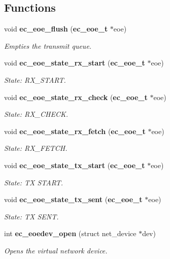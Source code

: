 \subsection*{Functions}
\begin{DoxyCompactItemize}
\item 
void {\bf ec\-\_\-eoe\-\_\-flush} ({\bf ec\-\_\-eoe\-\_\-t} $\ast$eoe)
\begin{DoxyCompactList}\small\item\em Empties the transmit queue. \end{DoxyCompactList}\item 
void {\bf ec\-\_\-eoe\-\_\-state\-\_\-rx\-\_\-start} ({\bf ec\-\_\-eoe\-\_\-t} $\ast$eoe)
\begin{DoxyCompactList}\small\item\em State\-: R\-X\-\_\-\-S\-T\-A\-R\-T. \end{DoxyCompactList}\item 
void {\bf ec\-\_\-eoe\-\_\-state\-\_\-rx\-\_\-check} ({\bf ec\-\_\-eoe\-\_\-t} $\ast$eoe)
\begin{DoxyCompactList}\small\item\em State\-: R\-X\-\_\-\-C\-H\-E\-C\-K. \end{DoxyCompactList}\item 
void {\bf ec\-\_\-eoe\-\_\-state\-\_\-rx\-\_\-fetch} ({\bf ec\-\_\-eoe\-\_\-t} $\ast$eoe)
\begin{DoxyCompactList}\small\item\em State\-: R\-X\-\_\-\-F\-E\-T\-C\-H. \end{DoxyCompactList}\item 
void {\bf ec\-\_\-eoe\-\_\-state\-\_\-tx\-\_\-start} ({\bf ec\-\_\-eoe\-\_\-t} $\ast$eoe)
\begin{DoxyCompactList}\small\item\em State\-: T\-X S\-T\-A\-R\-T. \end{DoxyCompactList}\item 
void {\bf ec\-\_\-eoe\-\_\-state\-\_\-tx\-\_\-sent} ({\bf ec\-\_\-eoe\-\_\-t} $\ast$eoe)
\begin{DoxyCompactList}\small\item\em State\-: T\-X S\-E\-N\-T. \end{DoxyCompactList}\item 
int {\bf ec\-\_\-eoedev\-\_\-open} (struct net\-\_\-device $\ast$dev)
\begin{DoxyCompactList}\small\item\em Opens the virtual network device. \end{DoxyCompactList}\item 

\end{DoxyCompactItemize}
